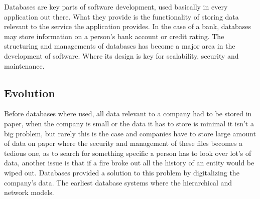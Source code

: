 Databases are key parts of software development, used basically in every application out there. What they provide is the functionality of storing data relevant to the service the application provides. In the case of a bank, databases may store information on a person’s bank account or credit rating. The structuring and managements of databases has become a major area in the development of software. Where its design is key for scalability, security and maintenance.

\subsection{Evolution}\label{sec:chap3_db_evo}

Before databases where used, all data relevant to a company had to be stored in paper, when the company is small or the data it has to store is minimal it isn’t a big problem, but rarely this is the case and companies have to store large amount of data on paper where the security and management of these files becomes a tedious one, as to search for something specific a person has to look over lot’s of data, another issue is that if a fire broke out all the history of an entity would be wiped out. Databases provided a solution to this problem by digitalizing the company’s data. The earliest database systems where the hierarchical and network models.

